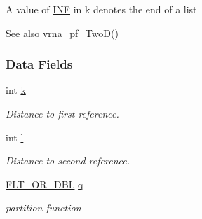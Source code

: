 A value of \hyperlink{energy__const_8h_a12c2040f25d8e3a7b9e1c2024c618cb6}{I\+N\+F} in k denotes the end of a list

\begin{DoxySeeAlso}{See also}
\hyperlink{group__kl__neighborhood__pf_ga0bc3427689bd09da09b8b3094a27f836}{vrna\+\_\+pf\+\_\+\+Two\+D()} 
\end{DoxySeeAlso}
\subsubsection*{Data Fields}
\begin{DoxyCompactItemize}
\item 
\hypertarget{group__kl__neighborhood__pf_ad1f23b46dc4ebd373abdeb0382d87b83}{int \hyperlink{group__kl__neighborhood__pf_ad1f23b46dc4ebd373abdeb0382d87b83}{k}}\label{group__kl__neighborhood__pf_ad1f23b46dc4ebd373abdeb0382d87b83}

\begin{DoxyCompactList}\small\item\em Distance to first reference. \end{DoxyCompactList}\item 
\hypertarget{group__kl__neighborhood__pf_a01133c264eff2c988d144e07803d1b8b}{int \hyperlink{group__kl__neighborhood__pf_a01133c264eff2c988d144e07803d1b8b}{l}}\label{group__kl__neighborhood__pf_a01133c264eff2c988d144e07803d1b8b}

\begin{DoxyCompactList}\small\item\em Distance to second reference. \end{DoxyCompactList}\item 
\hypertarget{group__kl__neighborhood__pf_a17ebbf425b8769ded74b5c7b85e58ee1}{\hyperlink{group__data__structures_ga31125aeace516926bf7f251f759b6126}{F\+L\+T\+\_\+\+O\+R\+\_\+\+D\+B\+L} \hyperlink{group__kl__neighborhood__pf_a17ebbf425b8769ded74b5c7b85e58ee1}{q}}\label{group__kl__neighborhood__pf_a17ebbf425b8769ded74b5c7b85e58ee1}

\begin{DoxyCompactList}\small\item\em partition function \end{DoxyCompactList}\end{DoxyCompactItemize}



